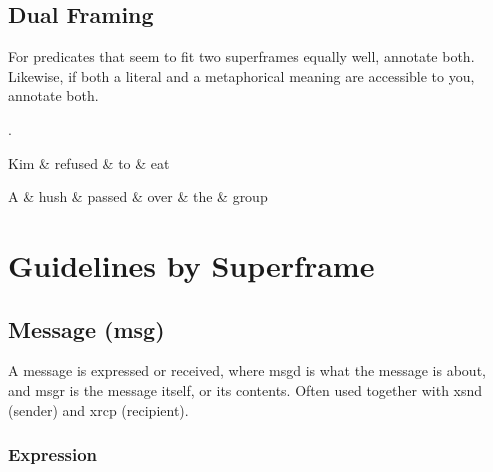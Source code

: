 \documentclass[a4paper]{article}
\begin{document}
\subsection{Dual Framing}

For predicates that seem to fit two superframes equally well, annotate both. Likewise, if both a literal and a metaphorical meaning are accessible to you, annotate both.

\ex.
\begin{dependency}
    \begin{deptext}
        Kim \& refused \& to \& eat \\
    \end{deptext}
\end{dependency}
\begin{dependency}
    \begin{deptext}
        A \& hush \& passed \& over \& the \& group \\
    \end{deptext}
\end{dependency}

\section{Guidelines by Superframe}


\subsection{Message (\textsf{msg})}
\label{sec:msg}

A message is expressed or received, where \textsf{msgd} is what the message is
about, and \textsf{msgr} is the message itself, or its contents. Often used
together with \textsf{xsnd} (sender) and \textsf{xrcp} (recipient).

\subsubsection{Expression}
\end{document}
